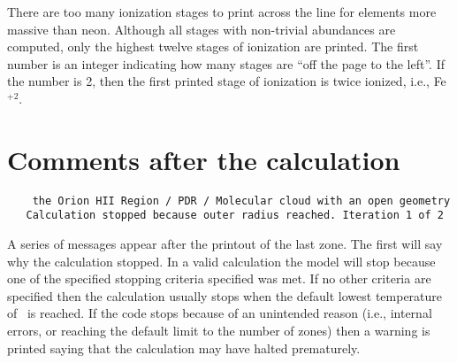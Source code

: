 There are too many ionization stages to print across the line for elements
more massive than neon.
Although all stages with non-trivial abundances
are computed, only the highest twelve stages of ionization are printed.
The first number is an integer indicating how many stages are ``off the
page to the left''.
If the number is 2, then the first printed stage of
ionization is twice ionized, i.e., Fe$^{+2}$.

\section{Comments after the calculation}
\label{sec:CommentsAfterCalculation}

{\setverbatimfontsize{\tiny}
\begin{verbatim}
    the Orion HII Region / PDR / Molecular cloud with an open geometry
   Calculation stopped because outer radius reached. Iteration 1 of 2
\end{verbatim}
}
A series of messages appear after the printout of the last zone.
The
first will say why the calculation stopped.
In a valid calculation the
model will stop because one of the specified stopping criteria specified
was met.
If no other criteria are specified then the calculation usually
stops when the default lowest temperature of
\TempStopDefault\ is reached.
If the
code stops because of an unintended reason (i.e., internal errors, or
reaching the default limit to the number of zones) then a warning is printed
saying that the calculation may have halted prematurely.

